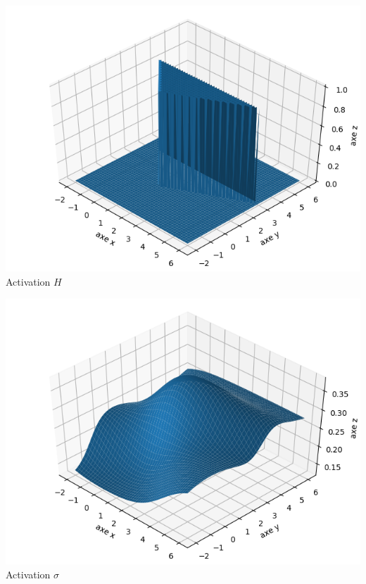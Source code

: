 \documentclass[11pt,class=report,crop=false]{standalone}
\begin{document}
\begin{exemple}
\begin{center}
\begin{minipage}{0.4\textwidth}
\center
\includegraphics[scale=\myscale,scale=0.4]{figures/neurones-surface-2-heaviside}
Activation $H$
\end{minipage}\quad
\begin{minipage}{0.4\textwidth}
\center
\includegraphics[scale=\myscale,scale=0.4]{figures/neurones-surface-2-sigma}
Activation $\sigma$
\end{minipage}
\end{center}


\end{exemple}
\end{document}
